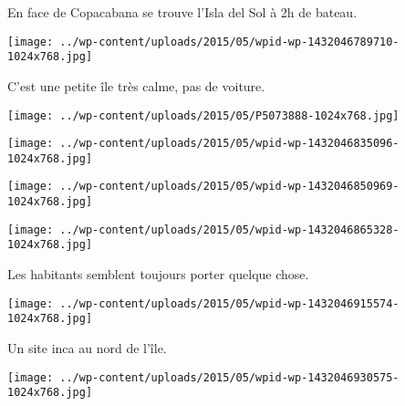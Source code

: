 

 En face de Copacabana se trouve l'Isla del Sol à 2h de bateau. 

 

\begin{center} \texttt{[image: ../wp-content/uploads/2015/05/wpid-wp-1432046789710-1024x768.jpg]} \end{center}

 

 C'est une petite île très calme, pas de voiture. 

 

\begin{center} \texttt{[image: ../wp-content/uploads/2015/05/P5073888-1024x768.jpg]} \end{center}

 

 

\begin{center} \texttt{[image: ../wp-content/uploads/2015/05/wpid-wp-1432046835096-1024x768.jpg]} \end{center}

 

 

\begin{center} \texttt{[image: ../wp-content/uploads/2015/05/wpid-wp-1432046850969-1024x768.jpg]} \end{center}

 

 

\begin{center} \texttt{[image: ../wp-content/uploads/2015/05/wpid-wp-1432046865328-1024x768.jpg]} \end{center}

 

 Les habitants semblent toujours porter quelque chose. 

 

\begin{center} \texttt{[image: ../wp-content/uploads/2015/05/wpid-wp-1432046915574-1024x768.jpg]} \end{center}

 

 Un site inca au nord de l'île. 

 

\begin{center} \texttt{[image: ../wp-content/uploads/2015/05/wpid-wp-1432046930575-1024x768.jpg]} \end{center}

